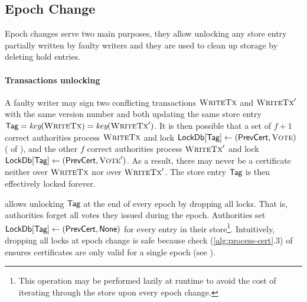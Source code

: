 

\subsection{Epoch Change} \label{sec:epoch-change}
Epoch changes serve two main purposes, they allow unlocking any store entry partially written by faulty writers and they are used to clean up storage by deleting hold entries.

\paragraph{Transactions unlocking}
A faulty writer may sign two conflicting transactions $\textsc{WriteTx}$ and $\textsc{WriteTx}'$ with the same version number and both updating the same store entry $\textsf{Tag} = \emph{key}(\textsc{WriteTx}) = \emph{key}(\textsc{WriteTx}')$. It is then possible that a set of $f+1$ correct authorities process $\textsc{WriteTx}$ and lock $\textsf{LockDb}[\textsf{Tag}] \gets (\textsf{PrevCert}, \textsc{Vote})$ ( of ), and the other $f$ correct authorities process $\textsc{WriteTx}'$ and lock $\textsf{LockDb}[\textsf{Tag}] \gets (\textsf{PrevCert}, \textsc{Vote}')$. As a result, there may never be a certificate neither over $\textsc{WriteTx}$ nor over $\textsc{WriteTx}'$. The store entry $\textsf{Tag}$ is then effectively locked forever.

\sysname allows unlocking $\textsf{Tag}$ at the end of every epoch by dropping all locks. That is, authorities forget all votes they issued during the epoch. Authorities set $\textsf{LockDb}[\textsf{Tag}] \gets (\textsf{PrevCert}, \textsf{None})$ for every entry in their store\footnote{
    This operation may be performed lazily at runtime to avoid the cost of iterating through the store upon every epoch change.
}.
%
Intuitively, dropping all locks at epoch change is safe because check (\ref{alg:process-cert}.3) of  ensures certificates are only valid for a single epoch (see ).

